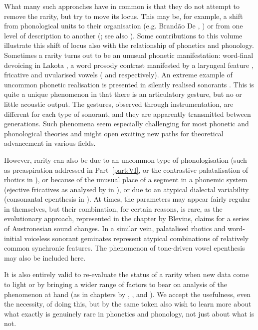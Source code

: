 \documentclass[output=paper]{langscibook}
\begin{document}
What many such approaches have in common is that they do not attempt to remove the rarity, but try to move its locus. This may be, for  example, a shift from phonological units to their organisation (e.g. Brandão De \citealt{Carvalho2006,DresherEtAl2018}, ) or from one level of description to another (\citealt{Kiparsky2018}; see also ). Some contributions to this volume illustrate this shift of locus also with the relationship of phonetics and phonology. Sometimes a rarity turns out to be an unusual phonetic manifestation: word-final devoicing in Lakota , a word prosody contrast manifested by a laryngeal feature , fricative and uvularised vowels ( and  respectively). An extreme example of uncommon phonetic realisation is presented in silently realised sonorants . This is quite a unique phenomenon in that there is an articulatory gesture, but no or little acoustic output. The gestures, observed through instrumentation, are different for each type of sonorant, and they are apparently transmitted between generations. Such phenomena seem especially challenging for most phonetic and phonological theories and might open exciting new paths for theoretical advancement in various fields.

However, rarity can also be due to an uncommon type of phonologisation (such as preaspiration addressed in Part~\ref{part:VI}, or the contrastive palatalisation of rhotics in ), or because of the unusual place of a segment in a phonemic system (ejective fricatives as analysed by in ), or due to an atypical dialectal variability (consonantal epenthesis in ). At times, the parameters may appear fairly regular in themselves, but their combination, for certain reasons, is rare, as the evolutionary approach, represented in the chapter by Blevins, claims for a series of Austronesian sound changes. In a similar vein, palatalised rhotics  and word-initial voiceless sonorant geminates  represent atypical combinations of relatively common synchronic features. The phenomenon of tone-driven vowel epenthesis  may also be included here.

It is also entirely valid to re-evaluate the status of a rarity when new data come to light or by bringing a wider range of factors to bear on analysis of the phenomenon at hand (as in chapters by , , and ). We accept the usefulness, even the necessity, of doing this, but by the same token also wish to learn more about what exactly is genuinely rare in phonetics and phonology, not just about what is not.
\end{document}
